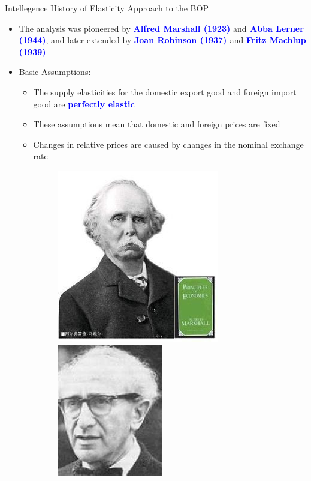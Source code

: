 \documentclass[10pt,hyperref={CJKbookmarks=true},xcolor=dvipsnames,aspectratio=169]{beamer}
\begin{document}
\begin{frame}{Intellegence History of Elasticity Approach to the BOP}

\begin{itemize}
\item The analysis was pioneered by \textbf{\textcolor{blue}{Alfred Marshall
(1923)}} and\textbf{\textcolor{blue}{{} Abba Lerner (1944)}}, and later
extended by \textbf{\textcolor{blue}{Joan Robinson (1937) }}and \textbf{\textcolor{blue}{Fritz
Machlup (1939)}}
\item Basic Assumptions:

\begin{itemize}
\item The supply elasticities for the domestic export good and foreign import
good are \textbf{\textcolor{blue}{perfectly elastic}}
\item These assumptions mean that domestic and foreign prices are fixed
\item Changes in relative prices are caused by changes in the nominal exchange
rate
\begin{figure}
\includegraphics[scale=0.3]{fig/boptheory/lec08-10.JPG}
\includegraphics[scale=0.3]{fig/boptheory/lec08-11.JPG}

\end{figure}

\end{itemize}
\end{itemize}
\end{frame}
\end{document}
